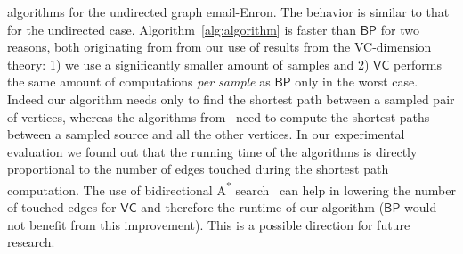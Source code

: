 algorithms for the undirected graph email-Enron. The behavior is  similar to
that for the undirected case. %
 Algorithm~\ref{alg:algorithm} is faster than $\mathsf{BP}$ for two reasons, both
originating from from our use of results from the VC-dimension theory: 1) we use
a significantly smaller amount of samples and 2) $\mathsf{VC}$ performs the
same amount of computations \emph{per sample} as $\mathsf{BP}$ only in the worst
case. Indeed our algorithm needs only to find the shortest path between a
sampled pair of vertices, whereas the algorithms
from~\citep{GeisbergerSS08,BrandesP07} need to compute the shortest paths
between a sampled source and all the other vertices. In our experimental
evaluation we found out that the running time of the algorithms is directly
proportional to the number of edges touched during the shortest path
computation. The use of bidirectional A\textsuperscript{*}
search~\citep{Pohl69,KaindlK97} can help in lowering the number of touched edges
for $\mathsf{VC}$ and therefore the runtime of our algorithm ($\mathsf{BP}$
would not benefit from this improvement). This is a possible direction for
future research. 

